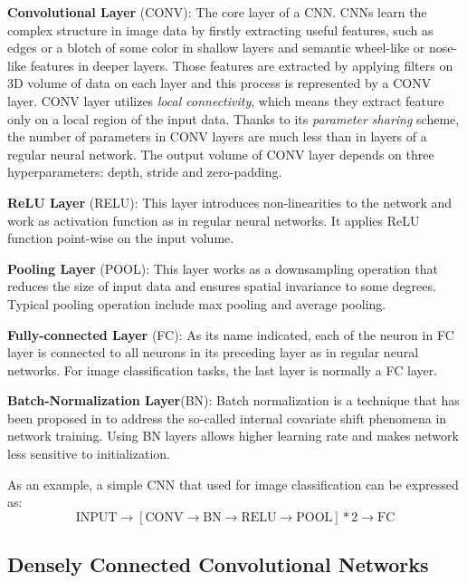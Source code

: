 \begin{my_enumerate}
\item \textbf{Convolutional Layer} (CONV): The core layer of a CNN. CNNs learn the complex structure in image data by firstly extracting useful features, such as edges or a blotch of some color in shallow layers and semantic wheel-like or nose-like features in deeper layers. Those features are extracted by applying filters on 3D volume of data on each layer and this process is represented by a CONV layer. CONV layer utilizes \textit{local connectivity}, which means they extract feature only on a local region of the input data. Thanks to its \textit{parameter sharing} scheme, the number of parameters in CONV layers are much less than in layers of a regular neural network. The output volume of CONV layer depends on three hyperparameters: depth, stride and zero-padding.
\item \textbf{ReLU Layer} (RELU): This layer introduces non-linearities to the network and work as activation function as in regular neural networks. It applies ReLU function point-wise on the input volume.
\item \textbf{Pooling Layer} (POOL): This layer works as a downsampling operation that reduces the size of input data and ensures spatial invariance to some degrees. Typical pooling operation include max pooling and average pooling.
\item \textbf{Fully-connected Layer} (FC): As its name indicated, each of the neuron in FC layer is connected to all neurons in its preceding layer as in regular neural networks. For image classification tasks, the last layer is normally a FC layer. 
\item \textbf{Batch-Normalization Layer}(BN): Batch normalization is a technique that has been proposed in \citep{ioffe2015batch} to address the so-called internal covariate shift phenomena in network training. Using BN layers allows higher learning rate and makes network less sensitive to initialization. 
\end{my_enumerate}

As an example, a simple CNN that used for image classification can be expressed as:
\begin{equation*}
\text{INPUT}\rightarrow[\text{CONV}\rightarrow \text{BN} \rightarrow \text{RELU} \rightarrow \text{POOL}] * 2 \rightarrow \text{FC}
\end{equation*}

\subsection{Densely Connected Convolutional Networks } \label{sec:dense_net}

